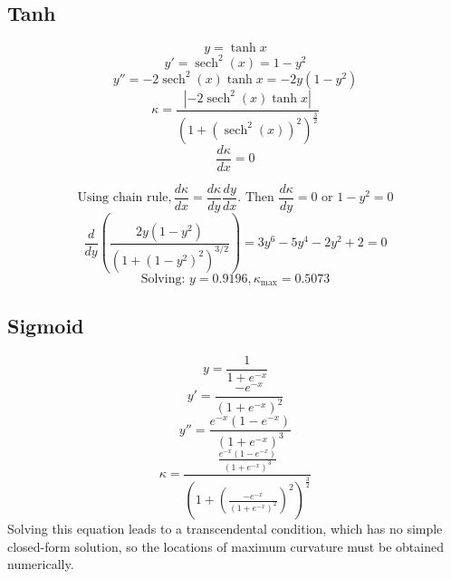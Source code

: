 \documentclass[manuscript, screen, review]{jair}
\begin{document}
\subsection{Tanh}\label{app:tanh}

\begin{displaymath}
  y = \tanh{x}
\end{displaymath}
\begin{displaymath}
y' = \operatorname{sech}^2(x) = 1 - y^2
\end{displaymath}
\begin{displaymath}
y'' = -2\operatorname{sech}^2(x)\tanh{x} = -2y(1 - y^2)
\end{displaymath}
\begin{displaymath}
\kappa = \frac{|-2\operatorname{sech}^2(x)\tanh{x}|}{(1 + (\operatorname{sech}^2(x))^2)^\frac{3}{2}}
\end{displaymath}
\begin{displaymath}
\frac{d \kappa}{dx} = 0 
\end{displaymath}

\begin{displaymath}
\text{Using chain rule}, \frac{d \kappa}{dx} = \frac{d \kappa}{dy}\frac{dy}{dx}\text{. Then } \frac{d \kappa}{dy} = 0 \text{ or } 1 - y^2 = 0
\end{displaymath}
\begin{displaymath}
  \frac{d}{dy}\left( \frac{2y(1 - y^2)}{(1 + (1 - y^2)^2)^{3/2}}\right) = 3y^6 - 5y^4 - 2y^2 + 2 = 0
\end{displaymath}
\begin{displaymath}
  \text{Solving: }y = 0.9196, \kappa_{\max} = 0.5073
\end{displaymath}

\subsection{Sigmoid}\label{app:sigmoid}

\begin{displaymath}
  y = \frac{1}{1 + e^{-x}}
\end{displaymath}
\begin{displaymath}
  y' = \frac{-e^{-x}}{(1 + e^{-x})^2}
\end{displaymath}
\begin{displaymath}
  y'' = \frac{e^{-x}(1 - e^{-x})}{(1 + e^{-x})^3}
\end{displaymath}
\begin{displaymath}
  \kappa = \frac{\frac{e^{-x}(1 - e^{-x})}{(1 + e^{-x})^3}}{(1 + ( \frac{-e^{-x}}{(1 + e^{-x})^2})^2)^\frac{3}{2}}
\end{displaymath}
Solving this equation leads to a transcendental condition, 
which has no simple closed-form solution, so the 
locations of maximum curvature must be obtained numerically.
\end{document}

